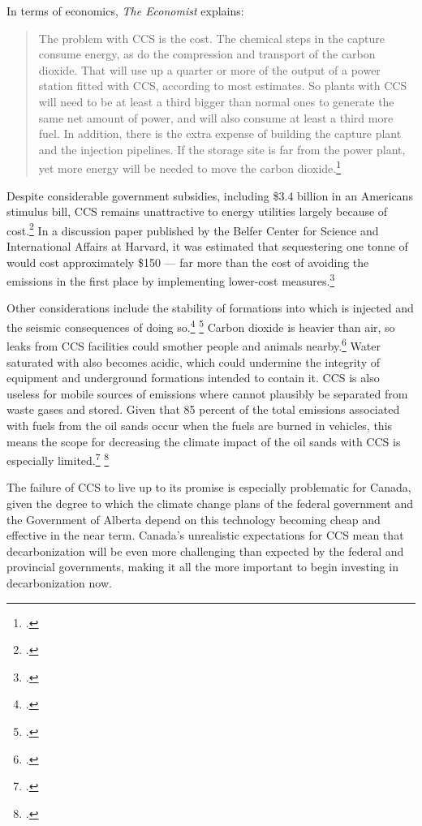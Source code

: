 In terms of economics, \emph{The Economist} explains:
\begin{quote}
The problem with CCS is the cost. The chemical steps in the capture consume energy, as do the compression and transport of the carbon dioxide. That will use up a quarter or more of the output of a power station fitted with CCS, according to most estimates. So plants with CCS will need to be at least a third bigger than normal ones to generate the same net amount of power, and will also consume at least a third more fuel. In addition, there is the extra expense of building the capture plant and the injection pipelines. If the storage site is far from the power plant, yet more energy will be needed to move the carbon dioxide.\footcite[][]{TroubleInStore}
\end{quote}
Despite considerable government subsidies, including \$3.4 billion in an Americans stimulus bill, CCS remains unattractive to energy utilities largely because of cost.\footcite[][]{IllusionCleanCoal}
In a discussion paper published by the Belfer Center for Science and International Affairs at Harvard, it was estimated that sequestering one tonne of  would cost approximately \$150 --- far more than the cost of avoiding the emissions in the first place by implementing lower-cost measures.\footcite[][]{RealisticCostsCarbonCapture}



Other considerations include the stability of formations into which  is injected and the seismic consequences of doing so.\footcite[][]{CCSEarthquake} \footcite[See also: ][]{AFPonCCS}
Carbon dioxide is heavier than air, so leaks from CCS facilities could smother people and animals nearby.\footcite[][]{TroubleInStore}
Water saturated with  also becomes acidic, which could undermine the integrity of equipment and underground formations intended to contain it.
CCS is also useless for mobile sources of emissions where  cannot plausibly be separated from waste gases and stored.
Given that 85 percent of the total emissions associated with fuels from the oil sands occur when the fuels are burned in vehicles, this means the scope for decreasing the climate impact of the oil sands with CCS is especially limited.\footcite[][]{HardToScrub} \footcite[][]{NoSilverBullet}



The failure of CCS to live up to its promise is especially problematic for Canada, given the degree to which the climate change plans of the federal government and the Government of Alberta depend on this technology becoming cheap and effective in the near term.
Canada's unrealistic expectations for CCS mean that decarbonization will be even more challenging than expected by the federal and provincial governments, making it all the more important to begin investing in decarbonization now.



